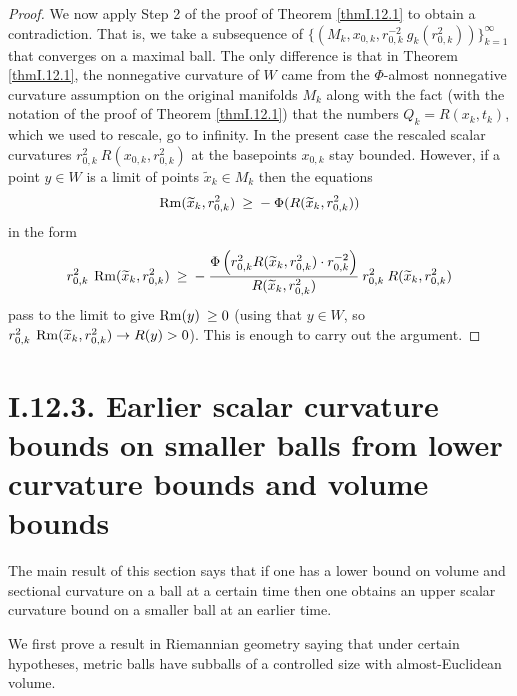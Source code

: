 \begin{proof}
We now apply Step 2 of the proof of Theorem \ref{thmI.12.1} to obtain a contradiction.
That is, we take a subsequence of
$\{(M_k, x_{0,k}, r_{0,k}^{-2} \: g_k(r_{0,k}^2))\}_{k=1}^\infty$ that converges on a maximal ball.
The only difference is that in Theorem \ref{thmI.12.1}, the nonnegative curvature
of $W$ came from the $\Phi$-almost nonnegative curvature assumption on the
original manifolds $M_k$ along with the fact (with the notation of the proof of
Theorem \ref{thmI.12.1})
that the numbers $Q_k = R(x_k, t_k)$, which
we used to rescale, go to infinity.
In the present case
the rescaled scalar curvatures $r_{0,k}^2 \: R(x_{0,k}, r_{0,k}^2)$ at the
basepoints $x_{0,k}$
stay bounded.
However, if a point $y \in W$ is a limit of points
$\widetilde{x}_k \in M_k$ then the equations
\begin{equation}
\operatorname{Rm}(\widetilde{x}_k, r_{0,k}^2) \: \ge \: - \: \Phi(R(\widetilde{x}_k, r_{0,k}^2))\end{equation} in the form
\begin{equation}
r_{0,k}^2 \: \operatorname{Rm}(\widetilde{x}_k, r_{0,k}^2) \: \ge \: - \:
\frac{\Phi \left(  r_{0,k}^{2}
R(\widetilde{x}_k, r_{0,k}^2) \cdot r_{0,k}^{-2}
\right)}{ R(\widetilde{x}_k, r_{0,k}^2)} \:
r_{0,k}^2 \: R(\widetilde{x}_k, r_{0,k}^2)
\end{equation}
pass to the limit to give $\operatorname{Rm}(y) \: \ge 0$
(using that $y \in W$, so $r_{0,k}^2 \: \operatorname{Rm}(\widetilde{x}_k, r_{0,k}^2) \rightarrow
R(y) > 0$).
This is enough to carry out the argument.
\end{proof}

\section{I.12.3. Earlier scalar curvature bounds on smaller balls from
lower curvature bounds and volume bounds}
\label{I.12.3}

The main result of this section
says that if one has a lower bound on volume and sectional curvature
on a ball at a certain time then one obtains an upper scalar curvature bound on
a smaller ball at an earlier time.

We first prove a result in Riemannian geometry saying that under
certain hypotheses, metric balls have subballs of a controlled size
with almost-Euclidean volume.

